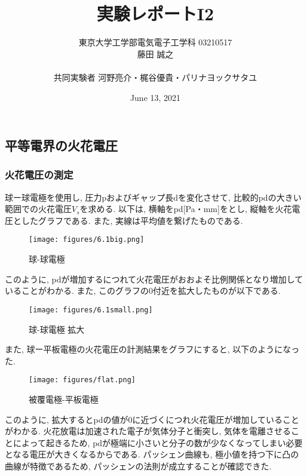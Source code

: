 \documentclass{ltjsarticle}
\title{実験レポートI2}
\author{東京大学工学部電気電子工学科 03210517\\藤田 誠之\\~\\ 共同実験者  河野亮介・梶谷優貴・パリナヨックサタユ}
\date{June 13, 2021}
\begin{document}
\maketitle

\setcounter{section}{6}

\subsection{平等電界の火花電圧}
\subsubsection{火花電圧の測定}

球ー球電極を使用し, 圧力pおよびギャップ長dを変化させて, 比較的pdの大きい範囲での火花電圧$V_s$を求める. 以下は, 横軸をpd[Pa・mm]をとし, 縦軸を火花電圧としたグラフである. また, 実線は平均値を繋げたものである. 

\begin{figure}[H]
    \begin{center}
        \texttt{[image: figures/6.1big.png]}
        \caption{球-球電極}
    \end{center}
\end{figure}

このように, pdが増加するにつれて火花電圧がおおよそ比例関係となり増加していることがわかる. また, このグラフの0付近を拡大したものが以下である. 

\begin{figure}[H]
    \begin{center}
        \texttt{[image: figures/6.1small.png]}
        \caption{球-球電極 拡大}
    \end{center}
\end{figure}

また, 球ー平板電極の火花電圧の計測結果をグラフにすると, 以下のようになった. 

\begin{figure}[H]
    \begin{center}
        \texttt{[image: figures/flat.png]}
        \caption{被覆電極-平板電極}
    \end{center}
\end{figure}

このように, 拡大するとpdの値が0に近づくにつれ火花電圧が増加していることがわかる. 火花放電は加速された電子が気体分子と衝突し, 気体を電離させることによって起きるため, pdが極端に小さいと分子の数が少なくなってしまい必要となる電圧が大きくなるからである. パッシェン曲線も, 極小値を持つ下に凸の曲線が特徴であるため, パッシェンの法則が成立することが確認できた. 
\end{document}
